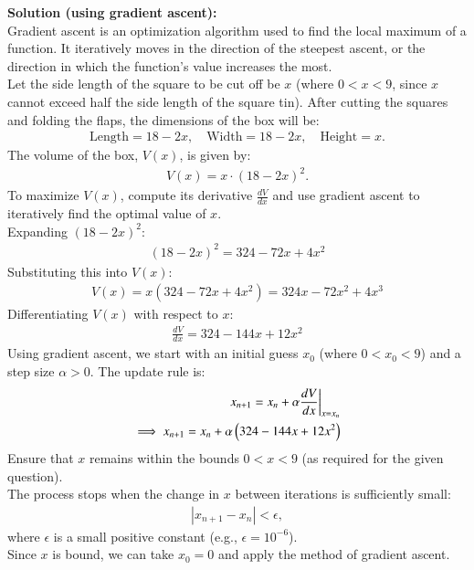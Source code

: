 \documentclass[journal]{IEEEtran}
\begin{document}
\textbf{Solution (using gradient ascent):} \\
Gradient ascent is an optimization algorithm used to find the local maximum of a function. It iteratively moves in the direction of the steepest ascent, or the direction in which the function's value increases the most. \\
Let the side length of the square to be cut off be $x$ (where $0 < x < 9$, since $x$ cannot exceed half the side length of the square tin). After cutting the squares and folding the flaps, the dimensions of the box will be:
\begin{align}
\text{Length} = 18 - 2x, \quad \text{Width} = 18 - 2x, \quad \text{Height} = x.
\end{align}
The volume of the box, $V(x)$, is given by: 
\begin{align}
V(x) = x \cdot (18 - 2x)^2.
\end{align}
To maximize $V(x)$, compute its derivative $\frac{dV}{dx}$ and use gradient ascent to iteratively find the optimal value of $x$. \\
Expanding $(18 - 2x)^2$:
\begin{align}
(18 - 2x)^2 = 324 - 72x + 4x^2
\end{align}
Substituting this into $V(x)$:
\begin{align}
V(x) = x(324 - 72x + 4x^2) = 324x - 72x^2 + 4x^3
\end{align}
Differentiating $V(x)$ with respect to $x$:
\begin{align}
\frac{dV}{dx} = 324 - 144x + 12x^2
\end{align}
Using gradient ascent, we start with an initial guess $x_0$ (where $0 < x_0 < 9$) and a step size $\alpha > 0$. The update rule is:
\begin{align}
x_{n+1} = x_n + \alpha \frac{dV}{dx}\bigg|_{x = x_n} \\
\implies x_{n+1} = x_n + \alpha \left(324 - 144x + 12x^2\right)
\end{align}
Ensure that $x$ remains within the bounds $0 < x < 9$ (as required for the given question). \\
The process stops when the change in $x$ between iterations is sufficiently small:
\begin{align}
|x_{n+1} - x_n| < \epsilon,
\end{align}
where $\epsilon$ is a small positive constant (e.g., $\epsilon = 10^{-6}$). \\
Since $x$ is bound, we can take $x_0 = 0$ and apply the method of gradient ascent.
\end{document}
